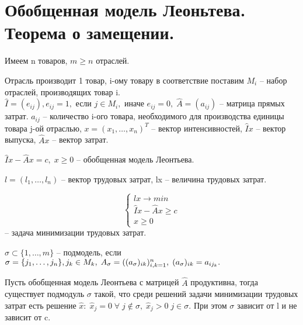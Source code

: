 \chapter{Обобщенная модель Леоньтева. Теорема о замещении.}\label{cha:11}

Имеем n товаров, $m \geq n$ отраслей.

Отрасль производит 1 товар, i-ому товару в соответствие поставим $M_i$ -- набор отраслей, производящих товар i. $\hat{I} = (e_{ij}), e_{ij} = 1, \text{ если } j \in M_i, \text{ иначе } e_{ij} = 0, \; \hat{A} = (a_{ij})$ -- матрица прямых затрат. $a_{ij}$ -- количество i-ого товара, необходимого для производства единицы товара j-ой отраслью, $x = (x_1, \ldots, x_n)^T$ -- вектор интенсивностей, $\hat{I}x$ -- вектор выпуска, $\hat{A}x$ -- вектор затрат.

\begin{definition}
	$\hat{I}x - \hat{A}x = c, \; x \geq 0$ -- обобщенная модель Леонтьева.
\end{definition}

\begin{definition}
	$l = (l_1, \ldots, l_n)$ -- вектор трудовых затрат, lx -- величина трудовых затрат.
\end{definition}

\begin{problem}
	$$\begin{cases}
		lx \to min\\
		\hat{I}x - \hat{A}x \geq c\\
		x \geq 0
	\end{cases}$$ -- задача минимизации трудовых затрат.
\end{problem}

\begin{definition}[Подмодель]
	$\sigma \subset \{1, \ldots, m \}$ -- подмодель, если $\sigma = \{j_1, \ldots, j_n \},\\ 
	j_k \in M_k, \; A_{\sigma} = ((a_{\sigma})_{ik})_{i,k = 1}^n, \; (a_{\sigma})_{ik} = a_{ij_k}.$
\end{definition}

\begin{theorem}
	Пусть обобщенная модель Леонтьева с матрицей $\hat{A}$ продуктивна, тогда существует подмодуль $\sigma$ такой, что среди решений задачи минимизации трудовых затрат есть решение $\hat{x}: \; \hat{x}_j = 0 \; \forall \; j \notin \sigma, \; \hat{x}_j > 0 \; j \in \sigma.$ При этом $\sigma$ зависит от l и не зависит от c.
\end{theorem}

